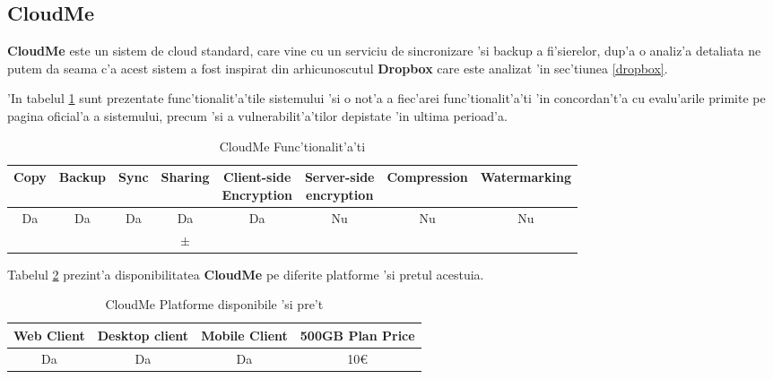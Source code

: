 \documentclass[12pt,a4paper,twoside]{report}
\newcommand{\greencheck}{\color{green}  \ding{51}}
\newcommand{\orangepm}{\color{orange} \textbf{$\pm$}}
\newcommand{\redxmark}{\color{red} \ding{55}}
\begin{document}
\subsection{CloudMe}

\textbf{CloudMe}\cite{cloudme_com} este un sistem de cloud standard, care vine cu un serviciu de sincronizare 'si backup a fi'sierelor, dup'a o analiz'a detaliata ne putem da seama c'a acest sistem a fost inspirat din arhicunoscutul \textbf{Dropbox} care este analizat 'in sec'tiunea \ref{dropbox}. 

'In tabelul \ref{table:cloudmefeaturetable} sunt prezentate func'tionalit'a'tile sistemului 'si o not'a a fiec'arei func'tionalit'a'ti 'in concordan't'a cu evalu'arile primite pe pagina oficial'a a sistemului, precum 'si a vulnerabilit'a'tilor depistate 'in ultima perioad'a.

\begin{table}[H]
\centering
\small
\caption{CloudMe Func'tionalit'a'ti}
\begin{tabular}{|c|c|c|c|c|c|c|c|}          
\hline               
Copy & Backup & Sync & Sharing & \makecell{Client-side\\ Encryption} & \makecell{Server-side \\ encryption} & Compression & Watermarking \\ [0.5ex]   
\hline 
Da & Da & Da & Da & Da &  Nu & Nu & Nu    \\                      
\greencheck & \greencheck & \redxmark\redxmark & \orangepm & \greencheck\greencheck & \redxmark\redxmark &  \redxmark\redxmark &  \redxmark\redxmark  \\               
\hline                              
\end{tabular}
\label{table:cloudmefeaturetable}             
\end{table}

Tabelul \ref{table:cloudmesystemtable} prezint'a disponibilitatea \textbf{CloudMe} pe diferite platforme 'si pretul acestuia.
\begin{table}[H]
\centering
\caption{CloudMe Platforme disponibile 'si pre't}
\begin{tabular}{|c|c|c|c|}          
\hline                      
 Web Client & Desktop client & Mobile Client & 500GB Plan Price\\ [0.5ex]   
\hline                            
Da & Da & Da & 10\euro\\               
\hline                              
\end{tabular}
\label{table:cloudmesystemtable}             
\end{table}
\end{document}
